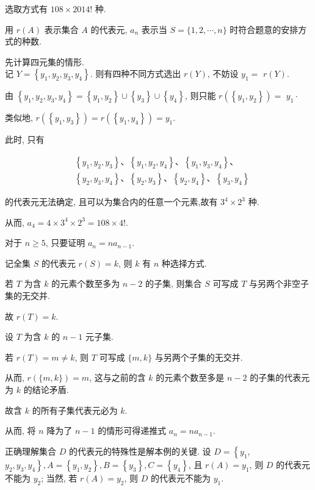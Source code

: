 \begin{solution}
	选取方式有 $108 \times 2014!$ 种.

	用 $r(A)$ 表示集合 $A$ 的代表元, $a_{n}$ 表示当 $S=\{1,2, \cdots, n\}$ 时符合题意的安排方式的种数.

	先计算四元集的情形.\\
	记 $Y=\left\{y_{1}, y_{2}, y_{3}, y_{4}\right\}$. 则有四种不同方式选出 $r(Y)$, 不妨设 $y_{1}=$ $r(Y)$.

	由 $\left\{y_{1}, y_{2}, y_{3}, y_{4}\right\}=\left\{y_{1}, y_{2}\right\} \cup\left\{y_{3}\right\} \cup\left\{y_{4}\right\}$, 则只能 $r\left(\left\{y_{1}, y_{2}\right\}\right)=$ $y_{1} \cdot$

	类似地, $r\left(\left\{y_{1}, y_{3}\right\}\right)=r\left(\left\{y_{1}, y_{4}\right\}\right)=y_{1}$.

	此时, 只有

	$$
		\begin{aligned}
			 & \left\{y_{1}, y_{2}, y_{3}\right\} 、\left\{y_{1}, y_{2}, y_{4}\right\} 、\left\{y_{1}, y_{3}, y_{4}\right\} 、              \\
			 & \left\{y_{2}, y_{3}, y_{4}\right\} 、\left\{y_{2}, y_{3}\right\} 、\left\{y_{2}, y_{4}\right\} 、\left\{y_{3}, y_{4}\right\}
		\end{aligned}
	$$

	的代表元无法确定, 且可以为集合内的任意一个元素,故有 $3^{4} \times 2^{3}$ 种.

	从而, $a_{4}=4 \times 3^{4} \times 2^{3}=108 \times 4!$.

	对于 $n \geqslant 5$, 只要证明 $a_{n}=n a_{n-1}$.

	记全集 $S$ 的代表元 $r(S)=k$, 则 $k$ 有 $n$ 种选择方式.

	若 $T$ 为含 $k$ 的元素个数至多为 $n-2$ 的子集, 则集合 $S$ 可写成 $T$ 与另两个非空子集的无交并.

	故 $r(T)=k$.

	设 $T$ 为含 $k$ 的 $n-1$ 元子集.

	若 $r(T)=m \neq k$, 则 $T$ 可写成 $\{m, k\}$ 与另两个子集的无交并.

	从而, $r(\{m, k\})=m$, 这与之前的含 $k$ 的元素个数至多是 $n-2$ 的子集的代表元为 $k$ 的结论矛盾.

	故含 $k$ 的所有子集代表元必为 $k$.

	从而, 将 $n$ 降为了 $n-1$ 的情形可得递推式 $a_{n}=n a_{n-1}$.
\end{solution}

\begin{note}
	正确理解集合 $D$ 的代表元的特殊性是解本例的关键. 设 $D=\left\{y_{1}\right.$, $\left.y_{2}, y_{3}, y_{4}\right\}, A=\left\{y_{1}, y_{2}\right\}, B=\left\{y_{3}\right\}, C=\left\{y_{4}\right\}$, 且 $r(A)=y_{1}$, 则 $D$ 的代表元不能为 $y_{2}$; 当然, 若 $r(A)=y_{2}$, 则 $D$ 的代表元不能为 $y_{1}$.
\end{note}

